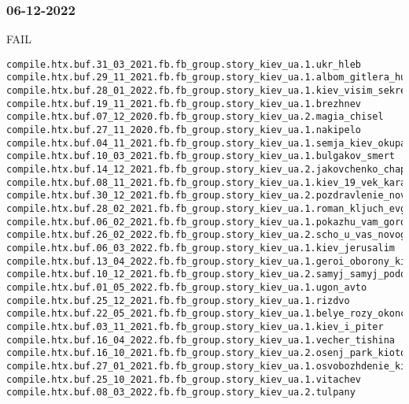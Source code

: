  
 
 
 
 

\subsubsection{06-12-2022}
\label{sec:build.log.06_12_2022}

FAIL

\begin{Verbatim}
compile.htx.buf.31_03_2021.fb.fb_group.story_kiev_ua.1.ukr_hleb
compile.htx.buf.29_11_2021.fb.fb_group.story_kiev_ua.1.albom_gitlera_hudozhnik_gluschenko
compile.htx.buf.28_01_2022.fb.fb_group.story_kiev_ua.1.kiev_visim_sekretiv
compile.htx.buf.19_11_2021.fb.fb_group.story_kiev_ua.1.brezhnev
compile.htx.buf.07_12_2020.fb.fb_group.story_kiev_ua.2.magia_chisel
compile.htx.buf.27_11_2020.fb.fb_group.story_kiev_ua.1.nakipelo
compile.htx.buf.04_11_2021.fb.fb_group.story_kiev_ua.1.semja_kiev_okupacia
compile.htx.buf.10_03_2021.fb.fb_group.story_kiev_ua.1.bulgakov_smert
compile.htx.buf.14_12_2021.fb.fb_group.story_kiev_ua.2.jakovchenko_chaplin
compile.htx.buf.08_11_2021.fb.fb_group.story_kiev_ua.1.kiev_19_vek_karaim_kupec_kogen
compile.htx.buf.30_12_2021.fb.fb_group.story_kiev_ua.2.pozdravlenie_novyj_god_rizdvo
compile.htx.buf.28_02_2021.fb.fb_group.story_kiev_ua.1.roman_kljuch_evgenij_iljin
compile.htx.buf.06_02_2021.fb.fb_group.story_kiev_ua.1.pokazhu_vam_gorod
compile.htx.buf.26_02_2022.fb.fb_group.story_kiev_ua.2.scho_u_vas_novogo
compile.htx.buf.06_03_2022.fb.fb_group.story_kiev_ua.1.kiev_jerusalim
compile.htx.buf.13_04_2022.fb.fb_group.story_kiev_ua.1.geroi_oborony_kieva
compile.htx.buf.10_12_2021.fb.fb_group.story_kiev_ua.2.samyj_samyj_podol
compile.htx.buf.01_05_2022.fb.fb_group.story_kiev_ua.1.ugon_avto
compile.htx.buf.25_12_2021.fb.fb_group.story_kiev_ua.1.rizdvo
compile.htx.buf.22_05_2021.fb.fb_group.story_kiev_ua.1.belye_rozy_okonchanie
compile.htx.buf.03_11_2021.fb.fb_group.story_kiev_ua.1.kiev_i_piter
compile.htx.buf.16_04_2022.fb.fb_group.story_kiev_ua.1.vecher_tishina
compile.htx.buf.16_10_2021.fb.fb_group.story_kiev_ua.2.osenj_park_kioto
compile.htx.buf.27_01_2021.fb.fb_group.story_kiev_ua.1.osvobozhdenie_kieva
compile.htx.buf.25_10_2021.fb.fb_group.story_kiev_ua.1.vitachev
compile.htx.buf.08_03_2022.fb.fb_group.story_kiev_ua.2.tulpany

\end{Verbatim}
